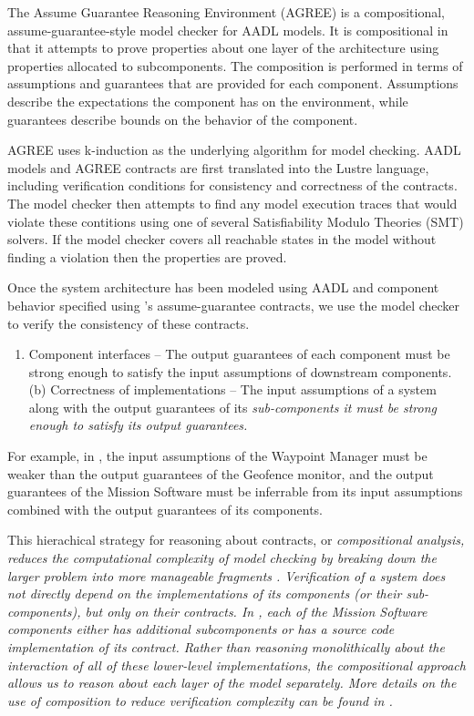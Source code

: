 
The Assume Guarantee Reasoning Environment (AGREE) is a compositional, assume-guarantee-style model
checker for AADL models. It is compositional in that it attempts to prove properties about one layer
of the architecture using properties allocated to subcomponents. The composition is performed in
terms of assumptions and guarantees that are provided for each component. Assumptions describe the
expectations the component has on the environment, while guarantees describe bounds on the behavior
of the component. 

AGREE uses k-induction as the underlying algorithm for model checking.  AADL models and AGREE
contracts are first translated into the Lustre language, including verification conditions for consistency
and correctness of the contracts.  The model checker then attempts to find any model execution traces
that would violate these contitions using one of several Satisfiability Modulo Theories (SMT) solvers. 
If the model checker covers all reachable states in the model without finding a violation then the properties are proved. 

Once the system architecture has been modeled using AADL
and component behavior specified using \agree's assume-guarantee contracts,
we use the \agree model checker to verify the consistency of these contracts.

\begin{enumerate}
\item Component interfaces -- The output guarantees of each component must be strong enough to
satisfy the input assumptions of downstream components. 
(b) Correctness of implementations -- The input assumptions of a system along with the 
output guarantees of its \em{sub}-components it must be strong enough to satisfy its output guarantees.
\end{enumerate}

For example, in ,
the input assumptions of the Waypoint Manager must be weaker than
the output guarantees of the Geofence monitor, 
and the output guarantees of the Mission Software must be inferrable from
its input assumptions combined with the output guarantees of its components.

This hierachical strategy for reasoning about contracts,
or \em{compositional analysis},
reduces the computational complexity of model checking
by breaking down the larger problem into more manageable fragments \cite{compositional-analysis-agree}.
Verification of a system does not directly depend on the implementations of its components (or their sub-components),
but only on their contracts.  
In , each of the Mission Software components either has additional subcomponents 
or has a source code implementation of its contract.  
Rather than reasoning monolithically about the interaction of all of these lower-level implementations, 
the compositional approach allows us to reason about each layer of the model separately.  
More details on the use of composition to reduce verification complexity can be found in \cite{case-models-2021}.
